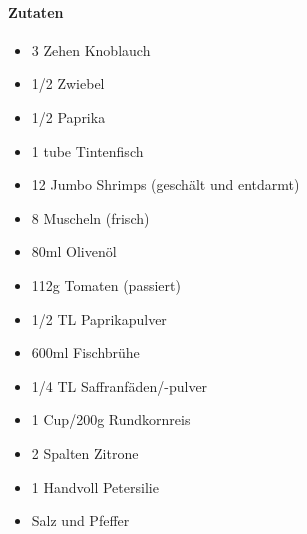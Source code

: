\newpage
{}
\paragraph{Zutaten}
\begin{itemize}[noitemsep]
	\item 3 Zehen Knoblauch
	\item 1/2 Zwiebel
	\item 1/2 Paprika
	\item 1 \glqq{}tube\grqq{} Tintenfisch
	\item 12 Jumbo Shrimps (geschält und entdarmt)
	\item 8 Muscheln (frisch)
	\item 80ml Olivenöl
	\item 112g Tomaten (passiert)
	\item 1/2 TL Paprikapulver
	\item 600ml Fischbrühe
	\item 1/4 TL Saffranfäden/-pulver
	\item 1 Cup/200g Rundkornreis
	\item 2 Spalten Zitrone
	\item 1 Handvoll Petersilie 
	\item Salz und Pfeffer
\end{itemize}
